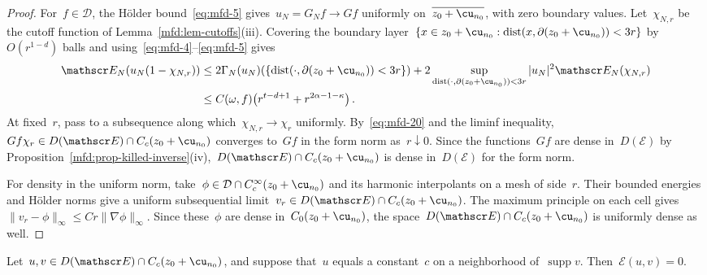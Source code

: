 \documentclass[11pt]{amsart}
\begin{document}
\begin{proof}
For~$f\in\mathcal D$, the H\"older bound~\eqref{eq:mfd-5} gives~$u_N=G_Nf\to Gf$ uniformly on~$\overline{z_0+\cu_{n_0}}$, with zero boundary values. Let~$\chi_{N,r}$ be the cutoff function of Lemma~\ref{mfd:lem-cutoffs}(iii). Covering the boundary layer~$\{x\in z_0+\cu_{n_0}:\operatorname{dist}(x,\partial(z_0+\cu_{n_0}))<3r\}$ by~$O(r^{1-d})$ balls and using~\eqref{eq:mfd-4}--\eqref{eq:mfd-5} gives
\begin{align}
	\mathscr E_N(u_N(1-\chi_{N,r}))
	&\leq 2\Gamma_N(u_N)(\{\operatorname{dist}(\cdot,\partial(z_0+\cu_{n_0}))<3r\})
	+2\sup_{\operatorname{dist}(\cdot,\partial(z_0+\cu_{n_0}))<3r}|u_N|^2\mathscr E_N(\chi_{N,r})
	\notag \\ &
	\leq C(\omega,f)\bigl(r^{t-d+1}+r^{2\alpha-1-\kappa}\bigr)\,.
	\label{eq:mfd-20}
\end{align}
At fixed~$r$, pass to a subsequence along which~$\chi_{N,r}\to\chi_r$ uniformly. By~\eqref{eq:mfd-20} and the liminf inequality,~$Gf\chi_r\in D(\mathscr E)\cap C_c(z_0+\cu_{n_0})$ converges to~$Gf$ in the form norm as~$r\downarrow0$. Since the functions~$Gf$ are dense in~$D(\mathscr E)$ by Proposition~\ref{mfd:prop-killed-inverse}(iv),~$D(\mathscr E)\cap C_c(z_0+\cu_{n_0})$ is dense in~$D(\mathscr E)$ for the form norm.

\smallskip

For density in the uniform norm, take~$\phi\in\mathcal D\cap C_c^\infty(z_0+\cu_{n_0})$ and its harmonic interpolants on a mesh of side~$r$. Their bounded energies and H\"older norms give a uniform subsequential limit~$v_r\in D(\mathscr E)\cap C_c(z_0+\cu_{n_0})$. The maximum principle on each cell gives~$\|v_r-\phi\|_\infty\leq Cr\|\nabla\phi\|_\infty$. Since these~$\phi$ are dense in~$C_0(z_0+\cu_{n_0})$, the space~$D(\mathscr E)\cap C_c(z_0+\cu_{n_0})$ is uniformly dense as well.
\end{proof}

\begin{proposition}
\label{mfd:prop-locality}
Let~$u,v\in D(\mathscr E)\cap C_c(z_0+\cu_{n_0})$, and suppose that~$u$ equals a constant~$c$ on a neighborhood of~$\operatorname{supp}v$. Then~$\mathscr E(u,v)=0$.
\end{proposition}
\end{document}
